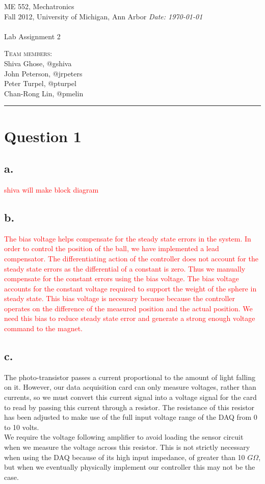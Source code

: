 \documentclass{article}
\newcommand{\shortbar}{\begin{center}\rule{5ex}{0.1pt}\end{center}}
\newcommand{\courseNumber}{ME 552}
\newcommand{\courseTitle}{Mechatronics}
\newcommand{\semester}{Fall 2012}
\newcommand{\xxx}[1]{\textcolor{red}{#1}}
\theoremstyle{plain}
\theoremstyle{definition}
\theoremstyle{remark}
\newenvironment{solution}[1]{\medskip\noindent{\bf Problem #1.~}}{\shortbar}
\newcommand{\solutions}[4]{
\vspace{-2ex}
\begin{center}
{\small  \courseNumber, \courseTitle
\hfill {\Large \bf {#1} }\\
\semester, University of Michigan, Ann Arbor \hfill
{\em Date: #3}}\\
\vspace{-1ex}
\hrulefill\\
\vspace{4ex}
{\LARGE Lab Assignment #2}\\
\vspace{2ex}
\end{center}
\begin{trivlist}
\item \textsc{Team members:\\} {#4}
\end{trivlist}
\noindent
\shortbar
\vspace{3ex}
}
\begin{document}
\solutions{}{2}{\today}{Shiva Ghose, @gshiva\\ John Peterson, @jrpeters\\ Peter Turpel, @pturpel\\ Chan-Rong Lin, @pmelin}
%
%

\section*{Question 1}
\subsection*{a.} \xxx{shiva will make block diagram}
\subsection*{b.}
\xxx{The bias voltage helps compensate for the steady state errors in the system. In order to control the position of the ball, we have implemented a lead compensator. The differentiating action of the controller does not account for the steady state errors as the differential of a constant is zero. Thus we manually compensate for the constant errors using the bias voltage. The bias voltage accounts for the constant voltage required to support the weight of the sphere in steady state.  This bias voltage is necessary because because the controller operates on the difference of the measured position and the actual position.  We need this bias to reduce steady state error and generate a strong enough voltage command to the magnet.}
\subsection*{c.}
The photo-transistor passes a current proportional to the amount of light falling on it.  However, our data acquisition card can only measure voltages, rather than currents, so we must convert this current signal into a voltage signal for the card to read by passing this current through a resistor. The resistance of this resistor has been adjusted to make use of the full input voltage range of the DAQ from 0 to 10 volts.\\  We require the voltage following amplifier to avoid loading the sensor circuit when we measure the voltage across this resistor.  This is not strictly necessary when using the DAQ because of its high input impedance, of greater than 10 $G\Omega$, but when we eventually physically implement our controller this may not be the case.  \\
\end{document}
